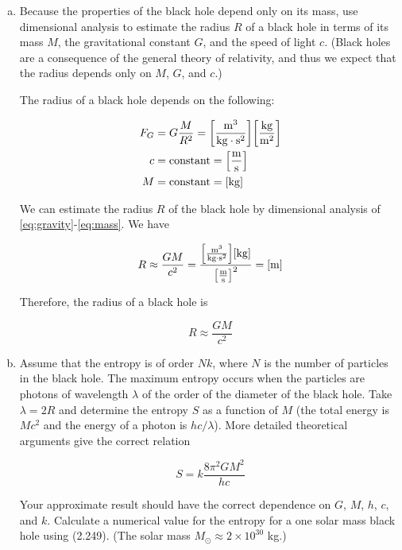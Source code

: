 \documentclass[9pt,a4paper,twocolumn]{article}
\begin{document}
\begin{enumerate}[(a)]

\item Because the properties of the black hole depend only on its mass, use dimensional analysis to estimate the radius $R$ of a black hole in terms of its mass $M$, the gravitational constant $G$, and the speed of light $c$. (Black holes are a consequence of the general theory of relativity, and thus we expect that the radius depends only on $M$, $G$, and $c$.)

The radius of a black hole depends on the following:

\begin{align}
	F_G &= G\frac{M}{R^2} = \mathrm{\qty[\frac{m^3}{kg\cdot s^2}]\qty[\frac{kg}{m^2}]} \label{eq:gravity} \\
	c &= \mathrm{constant} = \mathrm{\qty[\frac{m}{s}]} \label{eq:light} \\
	M &= \mathrm{constant} = \mathrm{\qty[kg]} \label{eq:mass}
\end{align}

We can estimate the radius $R$ of the black hole by dimensional analysis of \eqref{eq:gravity}-\eqref{eq:mass}. We have

\begin{equation}
	R \approx \frac{GM}{c^2} = \mathrm{\frac{\qty[\frac{m^3}{kg\cdot s^2}]\qty[kg]}{\qty[\frac{m}{s}]^2}} = \mathrm{\qty[m]}
\end{equation}

Therefore, the radius of a black hole is

\begin{equation}\label{eq:answer-a}
	\boxed{
		R \approx \frac{GM}{c^2}
	}
\end{equation}

\item Assume that the entropy is of order $Nk$, where $N$ is the number of particles in the black hole. The maximum entropy occurs when the particles are photons of wavelength $\lambda$ of the order of the diameter of the black hole. Take $\lambda = 2R$ and determine the entropy $S$ as a function of $M$ (the total energy is $Mc^2$ and the energy of a photon is $hc/\lambda$). More detailed theoretical arguments give the correct relation

\begin{equation}
	S = k\frac{8\pi^2 GM^2}{hc} \label{eq:2.54-theoretical}
\end{equation}

Your approximate result should have the correct dependence on $G$, $M$, $h$, $c$, and $k$. Calculate a numerical value for the entropy for a one solar mass black hole using (2.249). (The solar mass $M_\odot \approx 2 \times 10^{30}$ kg.)


\end{enumerate}
\end{document}
